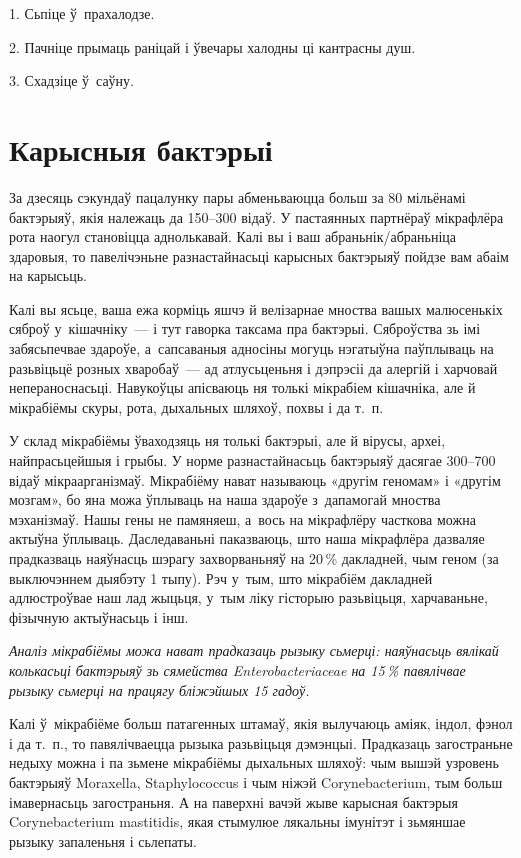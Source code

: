 1. Сьпіце ў~прахалодзе.

2. Пачніце прымаць раніцай і ўвечары халодны ці кантрасны душ.

3. Схадзіце ў~саўну.


\section{Карысныя бактэрыі}

За дзесяць сэкундаў пацалунку пары абменьваюцца больш за 80 мільёнамі бактэрыяў, якія належаць да 150--300 відаў. У пастаянных партнёраў мікрафлёра рота наогул становіцца аднолькавай. Калі вы і ваш абраньнік/абраньніца здаровыя, то павелічэньне разнастайнасьці карысных бактэрыяў пойдзе вам абаім на карысьць.

Калі вы ясьце, ваша ежа корміць яшчэ й велізарнае мноства вашых малюсенькіх сяброў у~кішачніку~--- і тут гаворка таксама пра бактэрыі. Сяброўства зь імі забясьпечвае здароўе, а~сапсаваныя адносіны могуць нэгатыўна паўплываць на разьвіцьцё розных хваробаў~--- ад атлусьценьня і дэпрэсіі да алергій і харчовай непераноснасьці. Навукоўцы апісваюць ня толькі мікрабіем кішачніка, але й мікрабіёмы скуры, рота, дыхальных шляхоў, похвы і да т.~п.

У склад мікрабіёмы ўваходзяць ня толькі бактэрыі, але й вірусы, археі, найпрасьцейшыя і грыбы. У норме разнастайнасьць бактэрыяў дасягае 300--700 відаў мікраарганізмаў. Мікрабіёму нават называюць «другім геномам» і «другім мозгам», бо яна можа ўплываць на наша здароўе з~дапамогай мноства мэханізмаў. Нашы гены не памяняеш, а~вось на мікрафлёру часткова можна актыўна ўплываць. Даследаваньні паказваюць, што наша мікрафлёра дазваляе прадказваць наяўнасць шэрагу захворваньняў на 20\,\% дакладней, чым геном (за выключэннем дыябэту 1 тыпу). Рэч у~тым, што мікрабіём дакладней адлюстроўвае наш лад жыцьця, у~тым ліку гісторыю разьвіцьця, харчаваньне, фізычную актыўнасьць і інш.

\emph{Аналіз мікрабіёмы можа нават прадказаць рызыку сьмерці: наяўнасьць вялікай колькасьці бактэрыяў зь сямейства Enterobacteriaceae на 15\,\% павялічвае рызыку сьмерці на працягу бліжэйшых 15 гадоў.}

Калі ў~мікрабіёме больш патагенных штамаў, якія вылучаюць аміяк, індол, фэнол і да т.~п., то павялічваецца рызыка разьвіцьця дэмэнцыі. Прадказаць загостраньне недыху можна і па зьмене мікрабіёмы дыхальных шляхоў: чым вышэй узровень бактэрыяў Moraxella, Staphylococcus і чым ніжэй Corynebacterium, тым больш імавернасьць загостраньня. А на паверхні вачэй жыве карысная бактэрыя Corynebacterium mastitidis, якая стымулюе лякальны імунітэт і зьмяншае рызыку запаленьня і сьлепаты.

